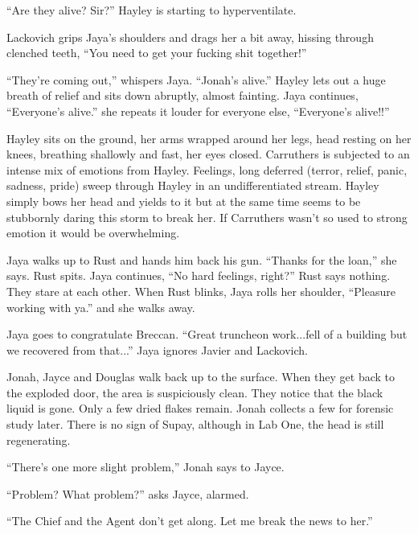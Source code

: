 ``Are they alive?  Sir?''  Hayley is starting to hyperventilate.

Lackovich grips Jaya's shoulders and drags her a bit away, hissing through clenched teeth, ``You need to get your fucking shit together!''


``They're coming out,'' whispers Jaya.  ``Jonah's alive.''  Hayley lets out a huge breath of relief and sits down abruptly, almost fainting.  Jaya continues, ``Everyone's alive.''  she repeats it louder for everyone else, ``Everyone's alive!!''



Hayley sits on the ground, her arms wrapped around her legs, head resting on her knees, breathing shallowly and fast, her eyes closed.  Carruthers is subjected to an intense mix of emotions from Hayley.  Feelings, long deferred (terror, relief, panic, sadness, pride) sweep through Hayley in an undifferentiated stream.  Hayley simply bows her head and yields to it but at the same time seems to be stubbornly daring this storm to break her.  If Carruthers wasn't so used to strong emotion it would be overwhelming. 



Jaya walks up to Rust and hands him back his gun.  ``Thanks for the loan,'' she says.  Rust spits.  Jaya continues, ``No hard feelings, right?'' Rust says nothing.  They stare at each other.  When Rust blinks, Jaya rolls her shoulder, ``Pleasure working with ya.'' and she walks away.



Jaya goes to congratulate Breccan.  ``Great truncheon work...fell of a building but we recovered from that...''  Jaya ignores Javier and Lackovich.



Jonah, Jayce and Douglas walk back up to the surface. When they get back to the exploded door, the area is suspiciously clean.  They notice that the black liquid is gone.  Only a few dried flakes remain.  Jonah collects a few for forensic study later.  There is no sign of Supay, although in Lab One, the head is still regenerating.

``There's one more slight problem,'' Jonah says to Jayce.

``Problem?  What problem?'' asks Jayce, alarmed.

``The Chief and the Agent don't get along.  Let me break the news to her.''

